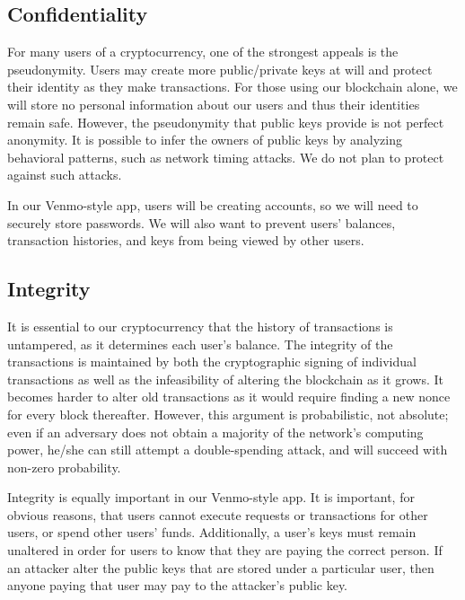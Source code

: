 \documentclass[12pt]{article}
\begin{document}
\subsection{Confidentiality}

For many users of a cryptocurrency, one of the strongest appeals is the pseudonymity.
Users may create more public/private keys at will and protect their identity as they make transactions.
For those using our blockchain alone, we will store no personal information about our users and thus their identities remain safe.
However, the pseudonymity that public keys provide is not perfect anonymity. It is possible to infer the owners of public keys by analyzing behavioral patterns, such as network timing attacks. We do not plan to protect against such attacks.

In our Venmo-style app, users will be creating accounts, so we will need to securely store passwords. We will also want to prevent users' balances, transaction histories, and keys from being viewed by other users.

\subsection{Integrity}

It is essential to our cryptocurrency that the history of transactions is untampered, as it determines each user's balance.
The integrity of the transactions is maintained by both the cryptographic signing of individual transactions as well as the infeasibility of altering the blockchain as it grows.
It becomes harder to alter old transactions as it would require finding a new nonce for every block thereafter.
However, this argument is probabilistic, not absolute; even if an adversary does not obtain a majority of the network's computing power, he/she can still attempt a double-spending attack, and will succeed with non-zero probability.

Integrity is equally important in our Venmo-style app.
It is important, for obvious reasons, that users cannot execute requests or transactions for other users, or spend other users' funds.
Additionally, a user's keys must remain unaltered in order for users to know that they are paying the correct person.
If an attacker alter the public keys that are stored under a particular user, then anyone paying that user may pay to the attacker's public key.
\end{document}
